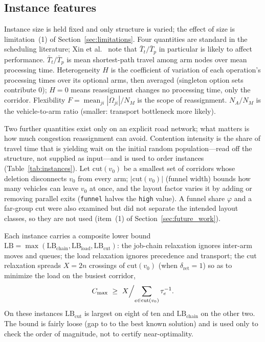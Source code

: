 \subsection{Instance features}
\label{sec:features}

Instance size is held fixed and only structure is varied; the effect of size is limitation~(1) of Section~\ref{sec:limitations}.
Four quantities are standard in the scheduling literature; Xin et al.~\cite{xin2025review} note that $\bar{T}_t/\bar{T}_p$ in particular is likely to affect performance.
$\bar{T}_t/\bar{T}_p$ is mean shortest-path travel among arm nodes over mean processing time.
Heterogeneity $H$ is the coefficient of variation of each operation's processing times over its optional arms, then averaged (singleton option sets contribute $0$); $H=0$ means reassignment changes no processing time, only the corridor.
Flexibility $F=\operatorname{mean}_{ji}|\Omega_{ji}|/N_M$ is the scope of reassignment.
$N_A/N_M$ is the vehicle-to-arm ratio (smaller: transport bottleneck more likely).

Two further quantities exist only on an explicit road network; what matters is how much congestion reassignment can avoid.
Contention intensity is the share of travel time that is yielding wait on the initial random population---read off the structure, not supplied as input---and is used to order instances (Table~\ref{tab:instances}).
Let $\mathrm{cut}(v_0)$ be a smallest set of corridors whose deletion disconnects $v_0$ from every arm; $|\mathrm{cut}(v_0)|$ (funnel width) bounds how many vehicles can leave $v_0$ at once, and the layout factor varies it by adding or removing parallel exits (\texttt{funnel} halves the \texttt{high} value).
A funnel share $\varphi$ and a far-group cut were also examined but did not separate the intended layout classes, so they are not used (item~(1) of Section~\ref{sec:future_work}).

Each instance carries a composite lower bound
$\mathrm{LB}=\max(\mathrm{LB}_{\text{chain}},\mathrm{LB}_{\text{load}},
\mathrm{LB}_{\text{cut}})$:
the job-chain relaxation ignores inter-arm moves and queues; the load relaxation ignores precedence and transport; the cut relaxation spreads $X=2n$ crossings of $\mathrm{cut}(v_0)$ (when $\delta_{\mathrm{ret}}=1$) so as to minimize the load on the busiest corridor,
\begin{equation}
\label{eq:lbcut}
C_{\max}\ \ge\ X\Bigl/\sum_{e\in \mathrm{cut}(v_0)}\tau_e^{-1}.
\end{equation}
On these instances $\mathrm{LB}_{\text{cut}}$ is largest on eight of ten and $\mathrm{LB}_{\text{chain}}$ on the other two.
The bound is fairly loose (gap \LBGapLo{} to \LBGapHi{} to the best known solution) and is used only to check the order of magnitude, not to certify near-optimality.

